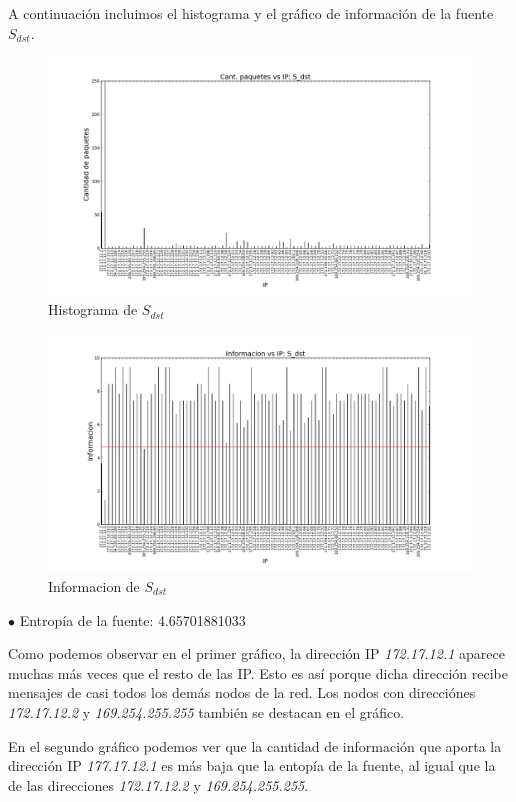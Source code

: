 A continuación incluimos el histograma y el gráfico de información de la fuente $S_{dst}$. 

\begin{figure}[H]\centering
  \includegraphics[width=0.8\linewidth]{../imgs/red-alto-palermo_S_dst_hist.png}
  \caption{Histograma de $S_{dst}$}\label{fig:Alto-dst-hist}
\end{figure}

\begin{figure}[H]\centering
  \includegraphics[width=0.8\linewidth]{../imgs/red-alto-palermo_S_dst_info.png}
  \caption{Informacion de $S_{dst}$}\label{fig:Alto-dst-info}
\end{figure}

$\bullet$ Entropía de la fuente: 4.65701881033

Como podemos observar en el primer gráfico, la dirección IP \emph{172.17.12.1} aparece muchas más veces que el resto de las IP. Esto es así porque dicha dirección recibe mensajes de casi todos los demás nodos de la red. Los nodos con direcciónes \emph{172.17.12.2} y \emph{169.254.255.255} también se destacan en el gráfico.

En el segundo gráfico podemos ver que la cantidad de información que aporta la dirección IP \emph{177.17.12.1} es más baja que la entopía de la fuente, al igual que la de las direcciones \emph{172.17.12.2} y \emph{169.254.255.255}.

